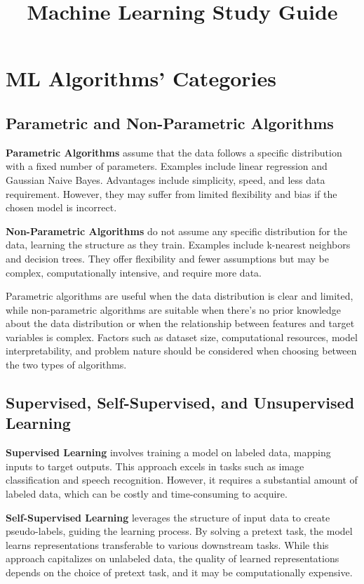 \documentclass[12pt]{article}
\begin{document}
\title{Machine Learning Study Guide}

\maketitle

\tableofcontents
\newpage


\section{ML Algorithms' Categories}
\subsection{Parametric and Non-Parametric Algorithms}

\textbf{Parametric Algorithms} assume that the data follows a specific distribution with a fixed number of parameters. Examples include linear regression and Gaussian Naive Bayes. Advantages include simplicity, speed, and less data requirement. However, they may suffer from limited flexibility and bias if the chosen model is incorrect.

\textbf{Non-Parametric Algorithms} do not assume any specific distribution for the data, learning the structure as they train. Examples include k-nearest neighbors and decision trees. They offer flexibility and fewer assumptions but may be complex, computationally intensive, and require more data.

Parametric algorithms are useful when the data distribution is clear and limited, while non-parametric algorithms are suitable when there's no prior knowledge about the data distribution or when the relationship between features and target variables is complex. Factors such as dataset size, computational resources, model interpretability, and problem nature should be considered when choosing between the two types of algorithms.

\subsection{Supervised, Self-Supervised, and Unsupervised Learning}
\textbf{Supervised Learning} involves training a model on labeled data, mapping inputs to target outputs. This approach excels in tasks such as image classification and speech recognition. However, it requires a substantial amount of labeled data, which can be costly and time-consuming to acquire.

\textbf{Self-Supervised Learning} leverages the structure of input data to create pseudo-labels, guiding the learning process. By solving a pretext task, the model learns representations transferable to various downstream tasks. While this approach capitalizes on unlabeled data, the quality of learned representations depends on the choice of pretext task, and it may be computationally expensive.
\end{document}
